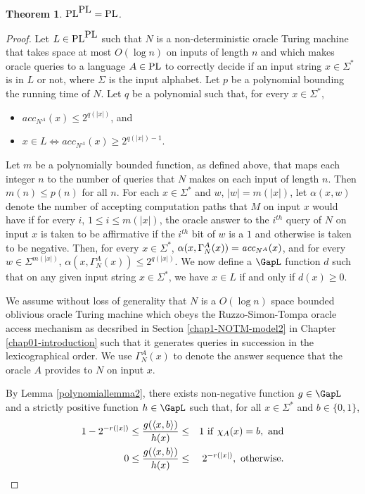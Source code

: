 \documentclass{amsbook}
\newtheorem{theorem}{Theorem}[chapter]
\theoremstyle{definition}
\theoremstyle{remark}
\numberwithin{section}{chapter}
\numberwithin{equation}{chapter}
\renewcommand{\PL}{\mbox{\rm PL}}
\newcommand{\acc}{\mbox{\it acc}}
\begin{document}
\begin{theorem}\label{plTuringclosure}
$\PL^{\PL}=\PL$.
\end{theorem}
\begin{proof}
Let $L\in \PL^{\PL}$ such that $N$ is a non-deterministic oracle Turing machine that takes space at most $O(\log n)$ on inputs of length $n$ and which makes oracle queries to a language $A\in\PL$ to correctly decide if an input string $x\in\Sigma^*$ is in $L$ or not, where $\Sigma$ is the input alphabet. Let $p$ be a polynomial bounding the running time of $N$. Let $q$ be a polynomial such that, for every $x\in\Sigma^*$,
\begin{itemize}
\item $acc_{N^A}(x)\leq 2^{q(|x|)}$, and
\item $x\in L\Leftrightarrow acc_{N^A}(x)\geq 2^{q(|x|)-1}$.
\end{itemize}
Let $m$ be a polynomially bounded function, as defined above, that maps each integer $n$ to the number of queries that $N$ makes on each input of length $n$. Then $m(n)\leq p(n)$ for all $n$. For each $x\in\Sigma^*$ and $w$, $|w|=m(|x|)$, let $\alpha (x,w)$ denote the number of accepting computation paths that $M$ on input $x$ would have if for every $i$, $1\leq i\leq m(|x|)$, the oracle answer to the $i^{th}$ query of $N$ on input $x$ is taken to be affirmative if the $i^{th}$ bit of $w$ is a $1$ and otherwise is taken to be negative. Then, for every $x\in\Sigma^*$, $\alpha (x,\Gamma_N^A(x))=\acc_{N^A}(x)$, and for every $w\in\Sigma^{m(|x|)}$, $\alpha (x,\Gamma_N^A(x))\leq 2^{q(|x|)}$. We now define a $\GapL$ function $d$ such that on any given input string $x\in\Sigma^*$, we have $x\in L$ if and only if $d(x)\geq 0$.

We assume without loss of generality that $N$ is a $O(\log n)$ space bounded oblivious oracle Turing machine which obeys the Ruzzo-Simon-Tompa oracle access mechanism as decsribed in Section \ref{chap1-NOTM-model2} in Chapter \ref{chap01-introduction} such that it generates queries in succession in the lexicographical order. We use $\Gamma_N^A(x)$ to denote the answer sequence that the oracle $A$ provides to $N$ on input $x$.

By Lemma \ref{polynomiallemma2}, there exists non-negative function $g\in\GapL$ and a strictly positive function $h\in\GapL$ such that, for all $x\in\Sigma^*$ and $b\in\{ 0,1\}$,
\begin{eqnarray*}
1-2^{-r(|x|)}\leq \frac{g(\langle x,b\rangle )}{h(x)}&\leq&1 {\rm ~if~}\chi_A(x)=b,~{\rm and}\\
0\leq \frac{g(\langle x,b\rangle )}{h(x)}&\leq&2^{-r(|x|)} {\rm ,~otherwise.}
\end{eqnarray*}


\end{proof}
\end{document}
